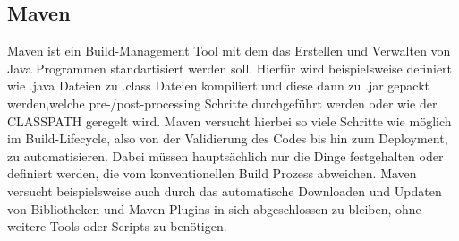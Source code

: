 \subsection{Maven}
Maven ist ein Build-Management Tool mit dem das Erstellen 
und Verwalten von Java Programmen standartisiert werden soll. 
Hierfür wird beispielsweise definiert wie .java Dateien zu .class Dateien kompiliert und 
diese dann zu .jar gepackt werden,welche pre-/post-processing Schritte durchgeführt werden oder wie der CLASSPATH geregelt wird.
Maven versucht hierbei so viele Schritte wie möglich im Build-Lifecycle, also von der Validierung des Codes
bis hin zum Deployment, zu automatisieren. Dabei müssen hauptsächlich nur die Dinge festgehalten oder definiert werden, die vom konventionellen Build Prozess abweichen. Maven versucht 
beispielsweise auch durch das automatische Downloaden und Updaten von Bibliotheken 
und Maven-Plugins in sich abgeschlossen zu bleiben, ohne weitere Tools oder Scripts 
zu benötigen. \cite{mavenwiki}  


